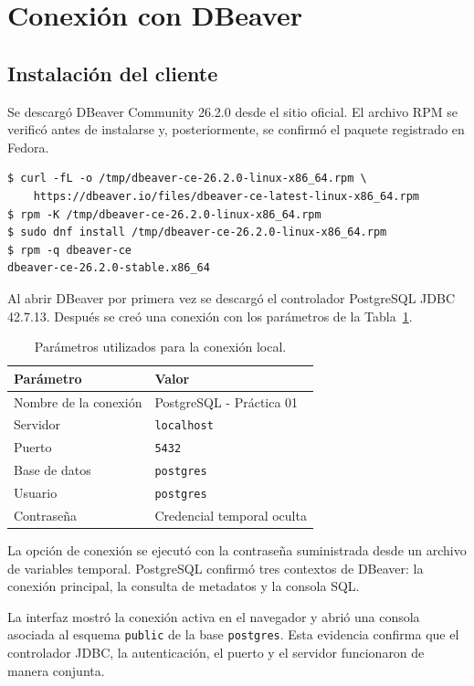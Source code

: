 \section{Conexión con DBeaver}

\subsection{Instalación del cliente}

Se descargó DBeaver Community 26.2.0 desde el sitio oficial. El archivo RPM se
verificó antes de instalarse y, posteriormente, se confirmó el paquete
registrado en Fedora.

\begin{lstlisting}[style=terminal]
$ curl -fL -o /tmp/dbeaver-ce-26.2.0-linux-x86_64.rpm \
    https://dbeaver.io/files/dbeaver-ce-latest-linux-x86_64.rpm
$ rpm -K /tmp/dbeaver-ce-26.2.0-linux-x86_64.rpm
$ sudo dnf install /tmp/dbeaver-ce-26.2.0-linux-x86_64.rpm
$ rpm -q dbeaver-ce
dbeaver-ce-26.2.0-stable.x86_64
\end{lstlisting}

Al abrir DBeaver por primera vez se descargó el controlador PostgreSQL JDBC
42.7.13. Después se creó una conexión con los parámetros de la
Tabla~\ref{tab:parametros-dbeaver}.

\begin{table}[H]
  \centering
  \begin{tabular}{ll}
    \toprule
    \textbf{Parámetro} & \textbf{Valor} \\
    \midrule
    Nombre de la conexión & PostgreSQL - Práctica 01 \\
    Servidor & \texttt{localhost} \\
    Puerto & \texttt{5432} \\
    Base de datos & \texttt{postgres} \\
    Usuario & \texttt{postgres} \\
    Contraseña & Credencial temporal oculta \\
    \bottomrule
  \end{tabular}
  \caption{Parámetros utilizados para la conexión local.}
  \label{tab:parametros-dbeaver}
\end{table}

La opción de conexión se ejecutó con la contraseña suministrada desde un
archivo de variables temporal. PostgreSQL confirmó tres contextos de DBeaver:
la conexión principal, la consulta de metadatos y la consola SQL.


La interfaz mostró la conexión activa en el navegador y abrió una consola
asociada al esquema \texttt{public} de la base \texttt{postgres}. Esta evidencia
confirma que el controlador JDBC, la autenticación, el puerto y el servidor
funcionaron de manera conjunta.

